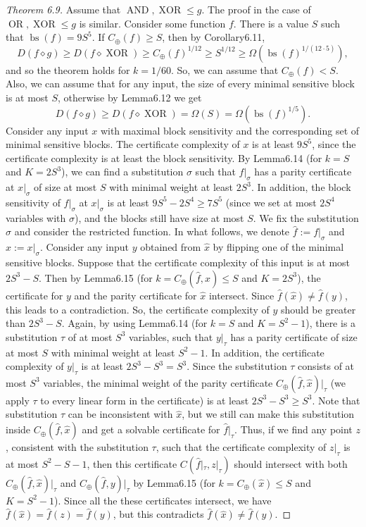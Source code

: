 \documentclass[10pt,a4paper]{article}
\newcommand{\comp}{\diamond}
\newcommand{\OR}{\operatorname{OR}}
\newcommand{\AND}{\operatorname{AND}}
\newcommand{\XOR}{\operatorname{XOR}}
\begin{document}
\begin{proof}[Theorem 6.9]
Assume that $\AND,\XOR\le g$. The proof in the case of $\OR,\XOR\le g$ is similar. Consider some function $f$. There is a value $S$ such that $\operatorname{bs}(f)=9S^5$. If $C_\oplus(f)\ge S$, then by Corollary6.11,
\[D(f\comp g)\ge D(f\comp\XOR)\ge C_\oplus(f)^{1/12}\ge S^{1/12}\ge\Omega(\operatorname{bs}(f)^{1/(12\cdot5)}),\]
and so the theorem holds for $k=1/60$. So, we can assume that $C_\oplus(f)<S$. Also, we can assume that for any input, the size of every minimal sensitive block is at most $S$, otherwise by Lemma6.12 we get
\[D(f\comp g)\ge D(f\comp\XOR)=\Omega(S)=\Omega(\operatorname{bs}(f)^{1/5}).\]
Consider any input $x$ with maximal block sensitivity and the corresponding set of minimal sensitive blocks. The certificate complexity of $x$ is at least $9S^5$, since the certificate complexity is at least the block sensitivity. By Lemma6.14 (for $k=S$ and $K=2S^3$), we can find a substitution $\sigma$ such that $f|_\sigma$ has a parity certificate at $x|_\sigma$ of size at most $S$ with minimal weight at least $2S^3$. In addition, the block sensitivity of $f|_\sigma$ at $x|_\sigma$ is at least $9S^5-2S^4\ge7S^5$ (since we set at most $2S^4$ variables with $\sigma$), and the blocks still have size at most $S$. We fix the substitution $\sigma$ and consider the restricted function. In what follows, we denote $\hat f:=f|_\sigma$ and $\hat x:=x|_\sigma$.
Consider any input $y$ obtained from $\hat x$ by flipping one of the minimal sensitive blocks. Suppose that the certificate complexity of this input is at most $2S^3-S$. Then by Lemma6.15 (for $k=C_\oplus(\hat f,\hat x)\le S$ and $K=2S^3$), the certificate for $y$ and the parity certificate for $\hat x$ intersect. Since $\hat f(\hat x)\ne\hat f(y)$, this leads to a contradiction. So, the certificate complexity of $y$ should be greater than $2S^3-S$.
Again, by using Lemma6.14 (for $k=S$ and $K=S^2-1$), there is a substitution $\tau$ of at most $S^3$ variables, such that $y|_\tau$ has a parity certificate of size at most $S$ with minimal weight at least $S^2-1$. In addition, the certificate complexity of $y|_\tau$ is at least $2S^3-S^3=S^3$.
Since the substitution $\tau$ consists of at most $S^3$ variables, the minimal weight of the parity certificate $C_\oplus(\hat f,\hat x)|_\tau$ (we apply $\tau$ to every linear form in the certificate) is at least $2S^3-S^3\ge S^3$. Note that substitution $\tau$ can be inconsistent with $\hat x$, but we still can make this substitution inside $C_\oplus(\hat f,\hat x)$ and get a solvable certificate for $\hat f|_\tau$. Thus, if we find any point $z$, consistent with the substitution $\tau$, such that the certificate complexity of $z|_\tau$ is at most $S^2-S-1$, then this certificate $C(\hat f|_\tau,z|_\tau)$ should intersect with both $C_\oplus(\hat f,\hat x)|_\tau$ and $C_\oplus(\hat f,y)|_\tau$ by Lemma6.15 (for $k=C_\oplus(\hat x)\le S$ and $K=S^2-1$). Since all the these certificates intersect, we have $\hat f(\hat x)=\hat f(z)=\hat f(y)$, but this contradicts $\hat f(\hat x)\ne\hat f(y)$.

\end{proof}
\end{document}

